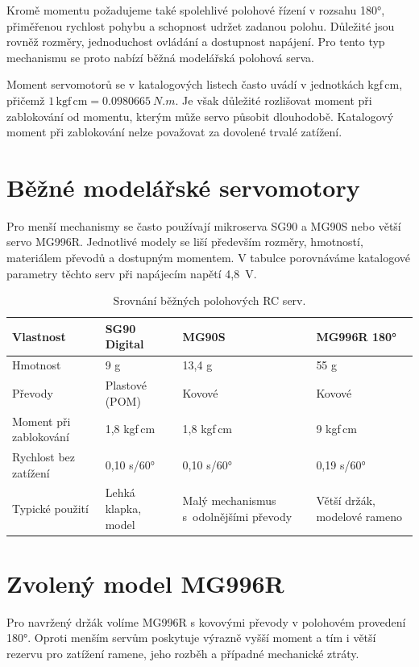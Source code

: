 Kromě momentu požadujeme také spolehlivé polohové řízení v rozsahu 180°, přiměřenou rychlost pohybu a schopnost udržet zadanou polohu. Důležité jsou rovněž rozměry, jednoduchost ovládání a dostupnost napájení. Pro tento typ mechanismu se proto nabízí běžná modelářská polohová serva.

Moment servomotorů se v katalogových listech často uvádí v jednotkách kgf\,cm, přičemž $1\,\mathrm{kgf\,cm}=\SI{0.0980665}{N.m}$. Je však důležité rozlišovat moment při zablokování od momentu, kterým může servo působit dlouhodobě. Katalogový moment při zablokování nelze považovat za dovolené trvalé zatížení.

\section{Běžné modelářské servomotory}

Pro menší mechanismy se často používají mikroserva SG90 a MG90S nebo větší servo MG996R. Jednotlivé modely se liší především rozměry, hmotností, materiálem převodů a dostupným momentem. V tabulce porovnáváme katalogové parametry těchto serv při napájecím napětí 4,8~V.~\cite{sg90,mg90s,mg180}

\begin{table}[htbp]\centering\small
\caption{Srovnání běžných polohových RC serv.}
\begin{tabularx}{\textwidth}{@{}lYYY@{}}\toprule
\textbf{Vlastnost} & \textbf{SG90 Digital} & \textbf{MG90S} & \textbf{MG996R 180°}\\\midrule
Hmotnost & 9 g & 13,4 g & 55 g\\\addlinespace
Převody & Plastové (POM) & Kovové & Kovové\\\addlinespace
Moment při zablokování & 1,8 kgf\,cm & 1,8 kgf\,cm & 9 kgf\,cm\\\addlinespace
Rychlost bez zatížení & 0,10 s/60° & 0,10 s/60° & 0,19 s/60°\\\addlinespace
Typické použití & Lehká klapka, model & Malý mechanismus s~odolnějšími převody & Větší držák, modelové rameno\\\bottomrule
\end{tabularx}
\end{table}

\FloatBarrier
\section{Zvolený model MG996R}

Pro navržený držák volíme MG996R s kovovými převody v polohovém provedení 180°. Oproti menším servům poskytuje výrazně vyšší moment a tím i větší rezervu pro zatížení ramene, jeho rozběh a případné mechanické ztráty.

